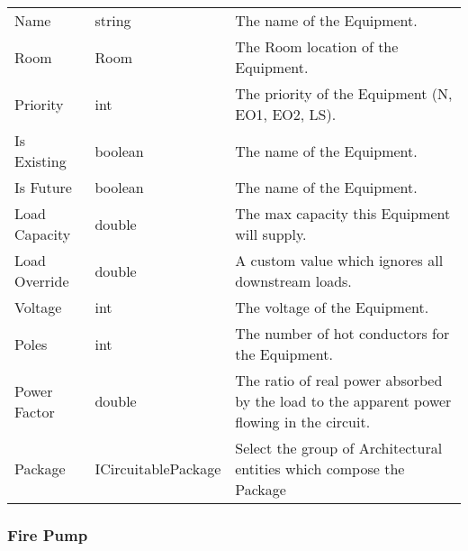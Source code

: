 \documentclass[letterpaper,10pt,english]{sphinxmanual}
\begin{document}
\begin{savenotes}\sphinxattablestart
\centering
\begin{tabulary}{\linewidth}[t]{|T|T|T|}
\hline
\sphinxstyletheadfamily 
{}
&\sphinxstyletheadfamily 
{}
&\sphinxstyletheadfamily 
{}
\\
\hline
Name
&
string
&
The name of the Equipment.
\\
\hline
Room
&
Room
&
The Room location of the Equipment.
\\
\hline
Priority
&
int
&
The priority of the Equipment (N, EO1, EO2, LS).
\\
\hline
Is Existing
&
boolean
&
The name of the Equipment.
\\
\hline
Is Future
&
boolean
&
The name of the Equipment.
\\
\hline
Load Capacity
&
double
&
The max capacity this Equipment will supply.
\\
\hline
Load Override
&
double
&
A custom value which ignores all downstream loads.
\\
\hline
Voltage
&
int
&
The voltage of the Equipment.
\\
\hline
Poles
&
int
&
The number of hot conductors for the Equipment.
\\
\hline
Power Factor
&
double
&
The ratio of real power absorbed by the load to the apparent power flowing in the circuit.
\\
\hline
Package
&
ICircuitablePackage
&
Select the group of Architectural entities which compose the Package
\\
\hline
\end{tabulary}
\par
\sphinxattableend\end{savenotes}


\subsubsection{Fire Pump}
\label{\detokenize{docs/definitions/index-definitions:fire-pump}}\label{\detokenize{docs/definitions/index-definitions:fire-pump-definition}}
\end{document}
